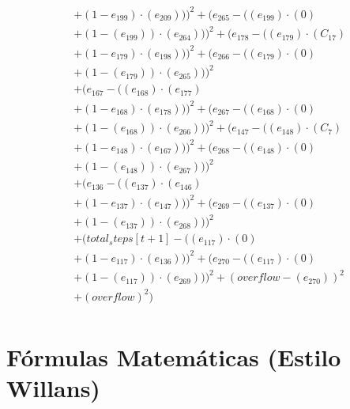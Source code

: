 \documentclass[10pt, a4paper]{article}
\begin{document}
\begin{small}
\begin{align*}
& + (1 - e_{199})  \cdot  (e_{209})))^{2} + (e_{265} - ((e_{199}) \cdot (0) \\
& + (1 - (e_{199})) \cdot (e_{264})))^{2} + (e_{178} - ((e_{179})  \cdot  (C_{17}) \\
& + (1 - e_{179})  \cdot  (e_{198})))^{2} + (e_{266} - ((e_{179}) \cdot (0) \\
& + (1 - (e_{179})) \cdot (e_{265})))^{2} \\
& + (e_{167} - ((e_{168})  \cdot  (e_{177}) \\
& + (1 - e_{168})  \cdot  (e_{178})))^{2} + (e_{267} - ((e_{168}) \cdot (0) \\
& + (1 - (e_{168})) \cdot (e_{266})))^{2} + (e_{147} - ((e_{148})  \cdot  (C_{7}) \\
& + (1 - e_{148})  \cdot  (e_{167})))^{2} + (e_{268} - ((e_{148}) \cdot (0) \\
& + (1 - (e_{148})) \cdot (e_{267})))^{2} \\
& + (e_{136} - ((e_{137})  \cdot  (e_{146}) \\
& + (1 - e_{137})  \cdot  (e_{147})))^{2} + (e_{269} - ((e_{137}) \cdot (0) \\
& + (1 - (e_{137})) \cdot (e_{268})))^{2} \\
& + (total_steps[t+1] - ((e_{117})  \cdot  (0) \\
& + (1 - e_{117})  \cdot  (e_{136})))^{2} + (e_{270} - ((e_{117}) \cdot (0) \\
& + (1 - (e_{117})) \cdot (e_{269})))^{2} + (overflow - (e_{270}))^{2} \\
& + (overflow)^{2}) \\
\end{align*}
\end{small}\part{Fórmulas Matemáticas (Estilo Willans)}
\end{document}
